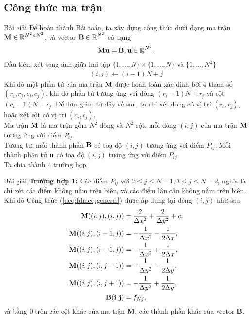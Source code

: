 \documentclass[9pt]{beamer}
\numberwithin{equation}{section}
\begin{document}
\subsection{Công thức ma trận}

\begin{frame}
\begin{exampleblock}{Bài giải}
    Để hoàn thành Bài toán, ta xây dựng công thức dưới dạng ma trận ${\bf M} \in \mathbb{R}^{N^2 \times N^2}$, và vector ${\bf B} \in \mathbb{R}^{N^2}$ có dạng
    \begin{align*}
        {\bf M} {\bf u} = {\bf B}, {\bf u} \in \mathbb{R}^{N^2}.
    \end{align*}
    Đầu tiên, xét song ánh giữa hai tập $\{1,\ldots,N\} \times \{1,\ldots,N\}$ và $\{1, \ldots, N^2\}$
    \begin{align*}
        (i,j) \longleftrightarrow (i-1)N + j
    \end{align*}
    Khi đó một phần tử của ma trận ${\bf M}$ được hoàn toàn xác định bởi 4 tham số $(r_i, r_j, c_i, c_j)$, khi đó phần tử tương ứng với dòng $(r_i - 1)N + r_j$ và cột $(c_i - 1)N + c_j$. Để đơn giản, từ đây về sau, ta chỉ xét dòng có vị trí $(r_i, r_j)$, hoặc xét cột có vị trí $(c_i, c_j)$. \\

    Ma trận ${\bf M}$ là ma trận gồm $N^2$ dòng và $N^2$ cột, mỗi dòng $(i,j)$ của ma trận ${\bf M}$ tương ứng với điểm $P_{ij}$. \\
    
    Tương tự, mỗi thành phần ${\bf B}$ có toạ độ $(i,j)$ tương ứng với điểm $P_{ij}$. Mỗi thành phần tử ${\bf u}$ có toạ độ $(i,j)$ tương ứng với điểm $P_{ij}$. \\
    
    Ta chia thành 4 trường hợp.
\end{exampleblock}
\end{frame}

\begin{frame}
\begin{exampleblock}{Bài giải}
    \textbf{Trường hợp 1:} Các điểm $P_{ij}$ với $2 \le j \le N-1, 3 \le j \le N-2$, nghĩa là chỉ xét các điểm không nằm trên biên, và các điểm lân cận không nằm trên biên. Khi đó Công thức (\ref{deq:fdmeq:general}) được áp dụng tại dòng $(i,j)$ như sau
    \begin{align*}
        {\bf M}((i,j),(i,j)) &= \frac{2}{\Delta x^2} + \frac{2}{\Delta y^2} + c, \\
        {\bf M}((i,j), (i-1,j)) &= -\frac{1}{\Delta x^2} - \frac{1}{2\Delta x}, \\
        {\bf M}((i,j), (i+1,j)) &= -\frac{1}{\Delta x^2} + \frac{1}{2\Delta x}, \\
        {\bf M}((i,j),(i,j-1)) &= -\frac{1}{\Delta y^2} - \frac{1}{2\Delta y}, \\
        {\bf M}((i,j),(i,j+1)) &= -\frac{1}{\Delta y^2} + \frac{1}{2\Delta y}, \\
        {\bf B(i,j)} &= f_{Nj},
    \end{align*}
    và bằng 0 trên các cột khác của ma trận ${\bf M}$, các thành phần khác của vector ${\bf B}$.
\end{exampleblock}
\end{frame}
\end{document}
